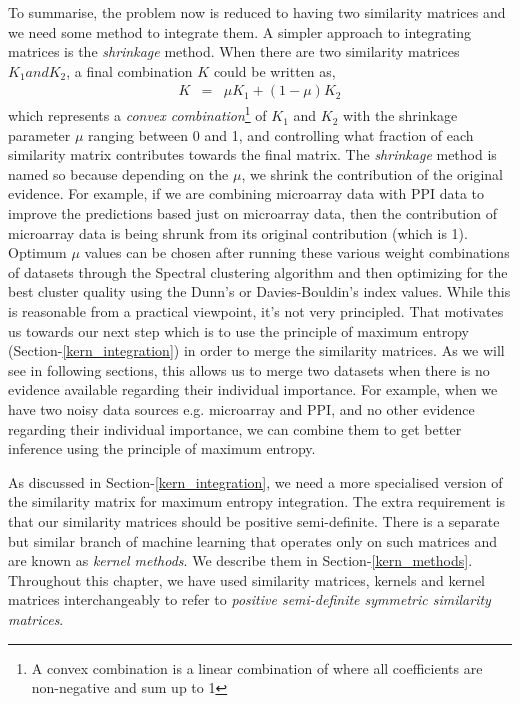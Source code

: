 To summarise, the problem now is reduced to having two similarity matrices and we need some method to integrate them. A simpler approach to integrating matrices 
is the \textit{shrinkage} method. When there are two similarity matrices $K_{1} and K_{2}$, a final combination $K$ could be written as,
\begin{eqnarray}
K &=& \mu K_{1}+(1-\mu)K_{2}
\end{eqnarray}
which represents a \textit{convex combination}\footnote{A convex combination is a linear combination of where all coefficients are non-negative and sum up to 1} 
of $K_{1}$ and $K_{2}$ with the shrinkage parameter $\mu$ ranging between 0 and 1, and controlling what fraction of each similarity matrix contributes 
towards the final matrix. The \textit{shrinkage} method is named so because depending on the $\mu$, we shrink the 
contribution of the original evidence. For example, if we are combining microarray data with \ac{PPI} data to improve the predictions based just on 
microarray data, then the contribution of microarray data is being shrunk from its original contribution (which is 1). Optimum $\mu$ values can be chosen after 
running these various weight combinations of datasets through the Spectral clustering algorithm and then optimizing for the best cluster quality using the Dunn's 
or Davies-Bouldin's index values. While this is reasonable from a practical viewpoint, it's not very principled. That motivates us towards our next step which is to use 
the principle of maximum entropy (Section-\ref{kern_integration}) in order to merge the similarity matrices. As we will see in following sections, this allows 
us to merge two datasets when there is no evidence available regarding their individual importance. For example, when we have two noisy data sources e.g. 
microarray and \ac{PPI}, and no other evidence regarding their individual importance, we can combine them to get better inference using the principle 
of maximum entropy.

As discussed in Section-\ref{kern_integration}, we need a more specialised version of the similarity matrix for maximum entropy integration. The extra requirement is that 
our similarity matrices should be positive semi-definite. There is a separate but similar branch of machine learning that operates only on such matrices and are 
known as \textit{kernel methods}. We describe them in Section-\ref{kern_methods}. Throughout this chapter, we have used similarity matrices, kernels and kernel 
matrices interchangeably to refer to \textit{positive semi-definite symmetric similarity matrices}.

